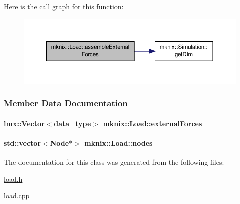 Here is the call graph for this function\-:\nopagebreak
\begin{figure}[H]
\begin{center}
\leavevmode
\includegraphics[width=350pt]{db/d1c/classmknix_1_1_load_a93aeafe41cb8ea7c97ae20b5870c5c9e_cgraph}
\end{center}
\end{figure}




\subsubsection{Member Data Documentation}
\hypertarget{classmknix_1_1_load_afbf0c36d2962e6bd85812ef7d498d314}{
\paragraph[{external\-Forces}]{\setlength{\rightskip}{0pt plus 5cm}lmx\-::\-Vector$<${\bf data\-\_\-type}$>$ mknix\-::\-Load\-::external\-Forces\hspace{0.3cm}{\ttfamily [protected]}}}\label{classmknix_1_1_load_afbf0c36d2962e6bd85812ef7d498d314}
\hypertarget{classmknix_1_1_load_a0cff22a8b9f289b38d978546160b6bb6}{
\paragraph[{nodes}]{\setlength{\rightskip}{0pt plus 5cm}std\-::vector$<${\bf Node}$\ast$$>$ mknix\-::\-Load\-::nodes\hspace{0.3cm}{\ttfamily [protected]}}}\label{classmknix_1_1_load_a0cff22a8b9f289b38d978546160b6bb6}


The documentation for this class was generated from the following files\-:\begin{DoxyCompactItemize}
\item 
\hyperlink{load_8h}{load.\-h}\item 
\hyperlink{load_8cpp}{load.\-cpp}\end{DoxyCompactItemize}
